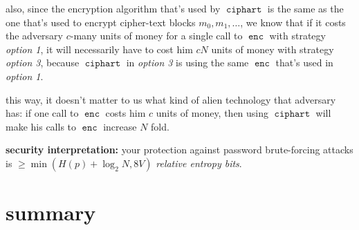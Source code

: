 \documentclass[twocolumn]{article}
\DeclareMathOperator{\enc}{\texttt{enc}}
\DeclareMathOperator{\ciphart}{\texttt{ciphart}}
\begin{document}
also, since the encryption algorithm that's used by $\ciphart$ is the same as
the one that's used to encrypt cipher-text blocks $m_0, m_1, \ldots$, we
know that if it costs the adversary $c$-many units of money for a single
call to $\enc$ with strategy \emph{option 1}, it will necessarily have to
cost him $cN$ units of money with strategy \emph{option 3}, because $\ciphart$
in \emph{option 3} is using the same $\enc$ that's used in \emph{option 1}.

this way, it doesn't matter to us what kind of alien technology that
adversary has:  if one call to $\enc$ costs him $c$ units of money, then
using $\ciphart$ will make his calls to $\enc$ increase $N$ fold.

\textbf{security interpretation:}  your protection against password
brute-forcing attacks is $\ge \min(H(p) + \log_2 N, 8V)$ \emph{relative
entropy bits}.

\section{summary}
\end{document}
